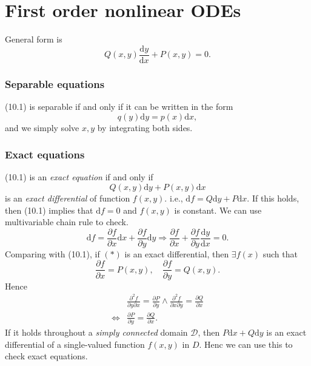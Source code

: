 \documentclass[10pt]{article}
\def\d{{\mathrm d}}
\begin{document}
    \part{First order nonlinear ODEs}
    General form is 
    \begin{equation}
        Q(x,y)\frac{\mathrm{d}y}{\mathrm{d}x}+P(x,y)=0.
    \end{equation}
    \section{Separable equations}
    (10.1) is separable if and only if it can be written in the form 
    \[
        q(y)\d y=p(x)\d x,
    \]
    and we simply solve $x,y$ by integrating both sides.
    \section{Exact equations}
    (10.1) is an \textit{exact equation} if and only if 
    \[
        Q(x,y)\d y+P(x,y)\d x\tag{*}
    \]
    is an \textit{exact differential} of function $f(x,y)$. i.e., $ \d f= Q\d y+P\d x $. If this holds, then (10.1) implies that $ \d f=0 $ and $f(x,y)$ is constant. We can use multivariable chain rule to check.
    \[
        \d f=\frac{\partial f}{\partial x}\d x+ \frac{\partial f}{\partial y}\d y \Longrightarrow \frac{\partial f}{\partial x}+\frac{\partial f}{\partial y}\frac{\mathrm{d}y}{\mathrm{d}x}=0     
    .\]
    Comparing with (10.1), if $(*)$ is an exact differential, then $\exists f(x)$ such that 
    \[
        \frac{\partial f}{\partial x}=P(x,y),\quad \frac{\partial f}{\partial y}=Q(x,y)  \tag{**}
    .\]
    Hence 
    \[
        \begin{aligned}
             & \frac{\partial^2 f}{\partial y\partial x} =\frac{\partial P}{\partial y} \land  \frac{\partial^2 f}{\partial x\partial y} =\frac{\partial Q}{\partial x}\\
             \Longleftrightarrow & \boxed{\frac{\partial P}{\partial y}=\frac{\partial Q}{\partial x}}.
        \end{aligned}
    \]
    If it holds throughout a \textit{simply connected} domain $\mathcal{D}$, then $ P\d x+Q\d y $ is an exact differential of a single-valued function $f(x,y)$ in $D$. Henc we can use this to check exact equations.
\end{document}
